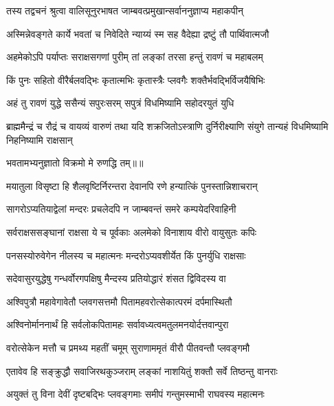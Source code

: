 
\twolineshloka
{तस्य तद्वचनं श्रुत्वा वालिसूनुरभाषत}
{जाम्बवत्प्रमुखान्सर्वाननुज्ञाप्य महाकपीन्} %

\twolineshloka
{अस्मिन्नेवङ्गते कार्ये भवतां च निवेदिते}
{न्याय्यं स्म सह वैदेह्या द्रष्टुं तौ पार्थिवात्मजौ} %

\twolineshloka
{अहमेकोऽपि पर्याप्तः सराक्षसगणां पुरीम्}
{तां लङ्कां तरसा हन्तुं रावणं च महाबलम्} %

\twolineshloka
{किं पुनः सहितो वीरैर्बलवद्भिः कृतात्मभिः}
{कृतास्त्रैः प्लवगैः शक्तैर्भवद्भिर्विजयैषिभिः} %

\twolineshloka
{अहं तु रावणं युद्धे ससैन्यं सपुरःसरम्}
{सपुत्रं विधमिष्यामि सहोदरयुतं युधि} %

\threelineshloka
{ब्राह्ममैन्द्रं च रौद्रं च वायव्यं वारुणं तथा}
{यदि शक्रजितोऽस्त्राणि दुर्निरीक्ष्याणि संयुगे}
{तान्यहं विधमिष्यामि निहनिष्यामि राक्षसान्} %

{भवतामभ्यनुज्ञातो विक्रमो मे रुणद्धि तम्॥॥} %

\addtocounter{shlokacount}{1}

\twolineshloka
{मयातुला विसृष्टा हि शैलवृष्टिर्निरन्तरा}
{देवानपि रणे हन्यात्किं पुनस्तान्निशाचरान्} %

\twolineshloka
{सागरोऽप्यतियाद्वेलां मन्दरः प्रचलेदपि}
{न जाम्बवन्तं समरे कम्पयेदरिवाहिनी} %

\twolineshloka
{सर्वराक्षससङ्घानां राक्षसा ये च पूर्वकाः}
{अलमेको विनाशाय वीरो वायुसुतः कपिः} %

\twolineshloka
{पनसस्योरुवेगेन नीलस्य च महात्मनः}
{मन्दरोऽप्यवशीर्येत किं पुनर्युधि राक्षसाः} %

\twolineshloka
{सदेवासुरयुद्धेषु गन्धर्वोरगपक्षिषु}
{मैन्दस्य प्रतियोद्धारं शंसत द्विविदस्य वा} %

\twolineshloka
{अश्विपुत्रौ महावेगावेतौ प्लवगसत्तमौ}
{पितामहवरोत्सेकात्परमं दर्पमास्थितौ} %

\twolineshloka
{अश्विनोर्माननार्थं हि सर्वलोकपितामहः}
{सर्वावध्यत्वमतुलमनयोर्दत्तवान्पुरा} %

\twolineshloka
{वरोत्सेकेन मत्तौ च प्रमथ्य महतीं चमूम्}
{सुराणाममृतं वीरौ पीतवन्तौ प्लवङ्गमौ} %

\twolineshloka
{एतावेव हि सङ्क्रुद्धौ सवाजिरथकुञ्जराम्}
{लङ्कां नाशयितुं शक्तौ सर्वे तिष्ठन्तु वानराः} %

\twolineshloka
{अयुक्तं तु विना देवीं दृष्टबद्भिः प्लवङ्गमाः}
{समीपं गन्तुमस्माभी राघवस्य महात्मनः} %

